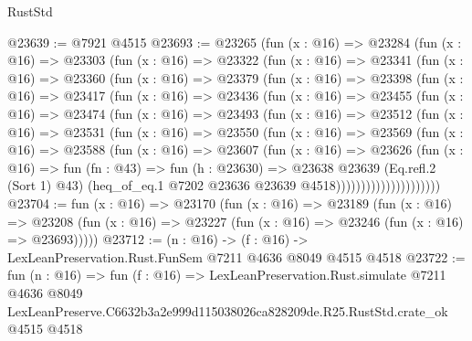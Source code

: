 \begin{lexlean}{RustStd}
\begin{coremodule}
@23639 := @7921 @4515
@23693 := @23265
    (fun (x : @16) =>
    @23284
      (fun (x : @16) =>
      @23303
        (fun (x : @16) =>
        @23322
          (fun (x : @16) =>
          @23341
            (fun (x : @16) =>
            @23360
              (fun (x : @16) =>
              @23379
                (fun (x : @16) =>
                @23398
                  (fun (x : @16) =>
                  @23417
                    (fun (x : @16) =>
                    @23436
                      (fun (x : @16) =>
                      @23455
                        (fun (x : @16) =>
                        @23474
                          (fun (x : @16) =>
                          @23493
                            (fun (x : @16) =>
                            @23512
                              (fun (x : @16) =>
                              @23531
                                (fun (x : @16) =>
                                @23550
                                  (fun (x : @16) =>
                                  @23569
                                    (fun (x : @16) =>
                                    @23588
                                      (fun (x : @16) =>
                                      @23607
                                        (fun (x : @16) =>
                                        @23626
                                          (fun (x : @16) =>
                                          fun (fn : @43) =>
                                          fun (h : @23630) =>
                                          @23638
                                            @23639
                                            (Eq.refl.{2} (Sort 1) @43)
                                            (heq_of_eq.{1}
                                              @7202
                                              @23636
                                              @23639
                                              @4518)))))))))))))))))))))
@23704 := fun (x : @16) =>
  @23170
    (fun (x : @16) =>
    @23189
      (fun (x : @16) =>
      @23208 (fun (x : @16) => @23227 (fun (x : @16) => @23246 (fun (x : @16) => @23693)))))
@23712 := (n : @16) -> (f : @16) -> LexLeanPreservation.Rust.FunSem @7211 @4636 @8049 @4515 @4518
@23722 := fun (n : @16) =>
  fun (f : @16) =>
  LexLeanPreservation.Rust.simulate
    @7211
    @4636
    @8049
    LexLeanPreserve.C6632b3a2e999d115038026ca828209de.R25.RustStd.crate_ok
    @4515
    @4518
\end{coremodule}
\end{lexlean}
